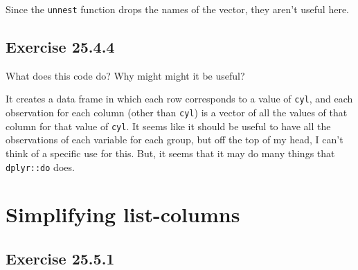 \documentclass[]{book}
\newenvironment{Shaded}{\begin{snugshade}}{\end{snugshade}}
\newcommand{\CommentTok}[1]{\textcolor[rgb]{0.56,0.35,0.01}{\textit{#1}}}
\newcommand{\KeywordTok}[1]{\textcolor[rgb]{0.13,0.29,0.53}{\textbf{#1}}}
\newcommand{\NormalTok}[1]{#1}
\newcommand{\OperatorTok}[1]{\textcolor[rgb]{0.81,0.36,0.00}{\textbf{#1}}}
\newcommand{\StringTok}[1]{\textcolor[rgb]{0.31,0.60,0.02}{#1}}
\theoremstyle{plain}
\theoremstyle{remark}
\begin{document}
Since the \texttt{unnest} function drops the names of the vector, they
aren't useful here.

\hypertarget{exercise-25.4.4}{%
\subsection*{\texorpdfstring{Exercise
{25.4.4}}{Exercise 25.4.4}}\label{exercise-25.4.4}}

What does this code do? Why might might it be useful?

\begin{Shaded}
\end{Shaded}

It creates a data frame in which each row corresponds to a value of
\texttt{cyl}, and each observation for each column (other than
\texttt{cyl}) is a vector of all the values of that column for that
value of \texttt{cyl}. It seems like it should be useful to have all the
observations of each variable for each group, but off the top of my
head, I can't think of a specific use for this. But, it seems that it
may do many things that \texttt{dplyr::do} does.

\hypertarget{simplifying-list-columns}{%
\section{Simplifying list-columns}\label{simplifying-list-columns}}

\hypertarget{exercise-25.5.1}{%
\subsection*{\texorpdfstring{Exercise
{25.5.1}}{Exercise 25.5.1}}\label{exercise-25.5.1}}
\end{document}

